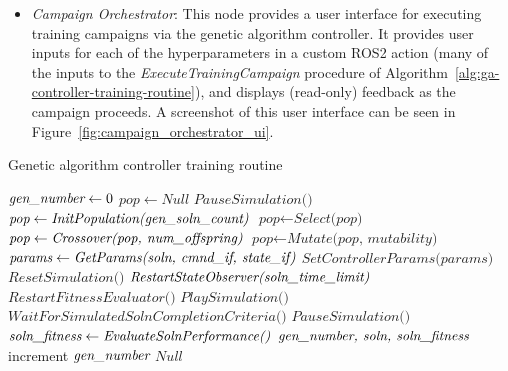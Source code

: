 \documentclass[conference]{IEEEtran}
\begin{document}
\begin{itemize}
		\item \textit{Campaign Orchestrator}: This node provides a user interface for executing training campaigns via the genetic algorithm controller. It provides user inputs for each of the hyperparameters in a custom ROS2 action (many of the inputs to the \textit{ExecuteTrainingCampaign} procedure of Algorithm~\ref{alg:ga-controller-training-routine}), and displays (read-only) feedback as the campaign proceeds. A screenshot of this user interface can be seen in Figure~\ref{fig:campaign_orchestrator_ui}.
	\end{itemize}

	\begin{algorithm}
		\caption{Genetic algorithm controller training routine}
		\label{alg:ga-controller-training-routine}
		\begin{algorithmic}[1]
			\State $\textit{gen\textunderscore number} \gets 0$
			\State $\textit{pop} \gets Null$ 
			\State $\textit{PauseSimulation()}$
			\Loop
			\State $\textit{pop} \gets \textit{InitPopulation(gen\textunderscore soln\textunderscore count)}$
			\Else
			\State $\textit{pop} \gets \textit{Select(pop)}$
			\State $\textit{pop} \gets \textit{Crossover(pop, num\textunderscore offspring)}$
			\State $\textit{pop} \gets \textit{Mutate(pop, mutability)}$
			\EndIf
			\State $\textit{params} \gets \textit{GetParams(soln, cmnd\textunderscore if, state\textunderscore if)}$
			\State $\textit{SetControllerParams(params)}$
			\State $\textit{ResetSimulation()}$
			\State $\textit{RestartStateObserver(soln\textunderscore time\textunderscore limit)}$
			\State $\textit{RestartFitnessEvaluator()}$
			\State $\textit{PlaySimulation()}$
			\State $\textit{WaitForSimulatedSolnCompletionCriteria()}$
			\State $\textit{PauseSimulation()}$
			\State $\textit{soln\textunderscore fitness} \gets \textit{EvaluateSolnPerformance()}$
			\State \Return $\textit{gen\textunderscore number, soln, soln\textunderscore fitness}$
			\EndIf
			\EndFor
			\State increment $\textit{gen\textunderscore number}$
			\State \Return $Null$
			\EndIf
			\EndLoop
			\EndProcedure
		\end{algorithmic}
	\end{algorithm}
\end{document}
